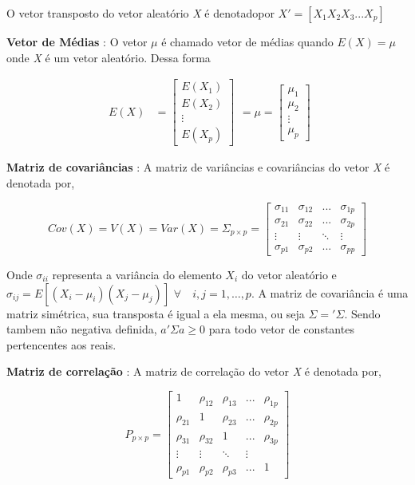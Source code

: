 \documentclass[
  letterpaper,
  DIV=11,
  numbers=noendperiod]{scrreprt}
\begin{document}
O vetor transposto do vetor aleatório \emph{X} é denotadopor
\(X' = [X_1 X_2 X_3 ...X_p]\)

\textbf{Vetor de Médias} : O vetor \(\mu\) é chamado vetor de médias
quando \(E(X) = \mu\) onde \emph{X} é um vetor aleatório. Dessa forma

\[
\begin{align}
  E(X) &= \begin{bmatrix}
           E(X_{1}) \\
           E(X_{2}) \\
           \vdots \\
           E(X_{p})
         \end{bmatrix}
  \end{align} = \mu = \begin{bmatrix}
           \mu_1 \\
           \mu_2 \\
           \vdots \\
           \mu_p
         \end{bmatrix}
\]

\textbf{Matriz de covariâncias} : A matriz de variâncias e covariâncias
do vetor \emph{X} é denotada por,

\[
Cov(X) = V(X) = Var(X) = \Sigma_{p\times p} = \begin{bmatrix}
           \sigma_{11} & \sigma_{12} & ... & \sigma_{1p}  \\
          \sigma_{21} & \sigma_{22} & ... & \sigma_{2p}  \\
            \vdots &\vdots & \ddots &\vdots \\
           \sigma_{p1} & \sigma_{p2} & ... & \sigma_{pp}
         \end{bmatrix}
\]

Onde \(\sigma_{ii}\) representa a variância do elemento \(X_i\) do vetor
aleatório e \(\sigma_{ij} = E[(X_i- \mu_i)(X_j - \mu_j)]\)
\(\forall\quad i,j = 1,\dots,p\). A matriz de covariância é uma matriz
simétrica, sua transposta é igual a ela mesma, ou seja
\(\Sigma = '\Sigma\). Sendo tambem não negativa definida,
\(a'\Sigma a \geq 0\) para todo vetor de constantes pertencentes aos
reais.

\textbf{Matriz de correlação} : A matriz de correlação do vetor \emph{X}
é denotada por,

\[
P_{p\times p} = \begin{bmatrix}
           1 & \rho_{12} & \rho_{13}& ... & \rho_{1p}  \\
          \rho_{21} & 1 & \rho_{23}&... & \rho_{2p}  \\
          \rho_{31} & \rho_{32} & 1 &... & \rho_{3p}  \\
            \vdots &\vdots & \ddots &\vdots \\
           \rho_{p1} & \rho_{p2} &\rho_{p3}& ... & 1
         \end{bmatrix}
\]
\end{document}
